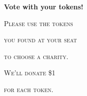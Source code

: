 \documentclass[12pt]{article}
\begin{document}
\pagestyle{empty}
\centering




\vspace*{.5in}

\textbf{\Huge Vote with your tokens!}
\vspace*{1in}




\textsc{\Huge Please use the tokens}
\vspace*{.05in}

\textsc{\Huge you found at your seat}
\vspace*{.05in}

\textsc{\Huge to choose a charity.}

\vspace*{.5in}

\textsc{\Huge We'll donate \$1}
\vspace*{.05in}

\textsc{\Huge for each token.}

\end{document}
